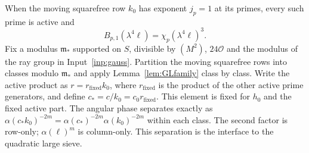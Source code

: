 \documentclass[11pt,a4paper]{article}
\numberwithin{equation}{section}
\theoremstyle{definition}
\theoremstyle{remark}
\newcommand{\OO}{\mathcal O}
\begin{document}
When the moving squarefree row $k_0$ has exponent $j_p=1$ at its primes, every such prime is active and
\[
 B_{p,1}(\lambda^4\ell)=\chi_p(\lambda^4\ell)^3.
\]
Fix a modulus $\mathfrak m_*$ supported on $S$, divisible by $(M^2)$, $24\OO$ and the modulus of the ray group in Input~\ref{inp:gauss}. Partition the moving squarefree rows into classes modulo $\mathfrak m_*$ and apply Lemma~\ref{lem:GLfamily} class by class. Write the active product as $r=r_{\mathrm{fixed}}k_0$, where $r_{\mathrm{fixed}}$ is the product of the other active prime generators, and define $c_*=c/k_0=c_0r_{\mathrm{fixed}}$. This element is fixed for $h_0$ and the fixed active part. The angular phase separates exactly as $\alpha(c_*k_0)^{-2m}=\alpha(c_*)^{-2m}\alpha(k_0)^{-2m}$ within each class. The second factor is row-only; $\alpha(\ell)^m$ is column-only. This separation is the interface to the quadratic large sieve.
\end{document}
